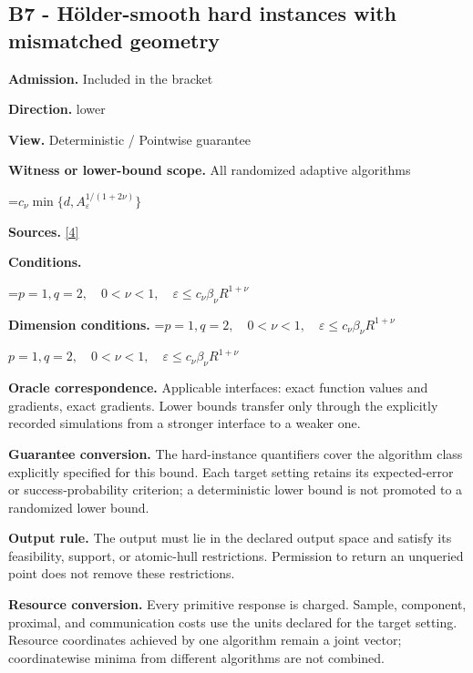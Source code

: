 \documentclass[10pt,a4paper]{article}
\newcommand{\AtlasMath}[1]{\par\begingroup\centering\setbox0=\hbox{$\displaystyle #1$}\ifdim\wd0>1.4\linewidth\typeout{ATLAS WIDE FORMULA: \the\wd0}\fi\ifdim\wd0>\linewidth\resizebox{\linewidth}{!}{\box0}\else\box0\fi\par\endgroup}
\newcommand{\AtlasInlineMath}[1]{\begingroup\setbox0=\hbox{$#1$}\ifdim\wd0>.4\linewidth\endgroup\AtlasMath{#1}\else\endgroup$#1$\fi}
\begin{document}
\subsection{B7 - Hölder-smooth hard instances with mismatched geometry}


\textbf{Admission.} Included in the bracket



\textbf{Direction.} lower



\textbf{View.} Deterministic / Pointwise guarantee



\textbf{Witness or lower-bound scope.} All randomized adaptive algorithms



\AtlasMath{c_\nu\min\{d,A_\varepsilon^{1/(1+2\nu)}\}}


\textbf{Sources.} \href{https://arxiv.org/pdf/2609.32910}{[4]}



\textbf{Conditions.}
\AtlasMath{p=1,q=2,\quad0<\nu<1,\quad\varepsilon\le c_\nu\beta_\nu R^{1+\nu}}




\textbf{Dimension conditions.} \AtlasInlineMath{p=1,q=2,\quad0<\nu<1,\quad\varepsilon\le c_\nu\beta_\nu R^{1+\nu}}



\textbf{Oracle correspondence.} Applicable interfaces: exact function values and gradients, exact gradients. Lower bounds transfer only through the explicitly recorded simulations from a stronger interface to a weaker one.



\textbf{Guarantee conversion.} The hard-instance quantifiers cover the algorithm class explicitly specified for this bound. Each target setting retains its expected-error or success-probability criterion; a deterministic lower bound is not promoted to a randomized lower bound.



\textbf{Output rule.} The output must lie in the declared output space and satisfy its feasibility, support, or atomic-hull restrictions. Permission to return an unqueried point does not remove these restrictions.



\textbf{Resource conversion.} Every primitive response is charged. Sample, component, proximal, and communication costs use the units declared for the target setting. Resource coordinates achieved by one algorithm remain a joint vector; coordinatewise minima from different algorithms are not combined.
\end{document}
